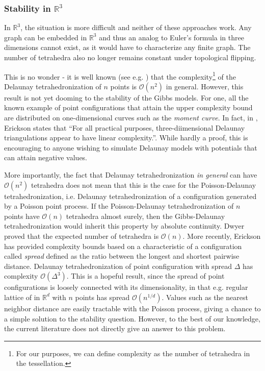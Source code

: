 \documentclass[12pt,a4paper]{article}
\newcommand{\R}{{\mathbb R^3}}
\theoremstyle{definition}
\theoremstyle{remark}
\theoremstyle{theorem}
\begin{document}
\subsubsection{Stability in $\R$}
In $\R$, the situation is more difficult and neither of these approaches work. Any graph can be embedded in $\R$\cite{3dGraph} and thus an analog to Euler's formula in three dimensions cannot exist, as it would have to characterize any finite graph. The number of tetrahedra also no longer remains constant under topological flipping\cite{Joe91}. 

This is no wonder - it is well known (see e.g. \cite{Amenta07}) that the complexity\footnote{For our purposes, we can define complexity as the number of tetrahedra in the tessellation.} of the Delaunay tetrahedronization of $n$ points is $\mathcal O(n^2)$ in general. However, this result is not yet dooming to the stability of the Gibbs models. For one, all the known example of point configurations that attain the upper complexity bound are distributed on one-dimensional curves such as the \textit{moment curve}\cite{Amenta07}. In fact, in \cite{Erickson01}, Erickson states that ``For all practical purposes, three-diimensional Delaunay triangulations appear to have linear complexity.''. While hardly a proof, this is encouraging to anyone wishing to simulate Delaunay models with potentials that can attain negative values.

More importantly, the fact that Delaunay tetrahedronization \textit{in general} can have $\mathcal O(n^2)$ tetrahedra does not mean that this is the case for the Poisson-Delaunay tetrahedronization, i.e. Delaunay tetrahedronization of a configuration generated by a Poisson point process. If the Poisson-Delaunay tetrahedronization of $n$ points have $\mathcal O(n)$ tetrahedra almost surely, then the Gibbs-Delaunay tetrahedronization would inherit this property by absolute continuity. Dwyer \cite{Dwyer93} proved that the expected number of tetrahedra is $\mathcal O(n)$. More recently, Erickson has provided \cite{Erickson01}\cite{Erickson05} complexity bounds based on a characteristic of a configuration called \textit{spread} defined as the ratio between the longest and shortest pairwise distance. Delaunay tetrahedronization of point configuration with spread $\Delta$ has complexity $\mathcal O(\Delta^3)$. This is a hopeful result, since the spread of point configurations is loosely connected with its dimensionality, in that e.g. regular lattice of in $\mathbb R^d$ with $n$ points has spread $\mathcal O(n^{1/d})$. Values such as the nearest neighbor distance are easily tractable with the Poisson process, giving a chance to a simple solution to the stability question. However, to the best of our knowledge, the current literature does not directly give an answer to this problem.
\end{document}
